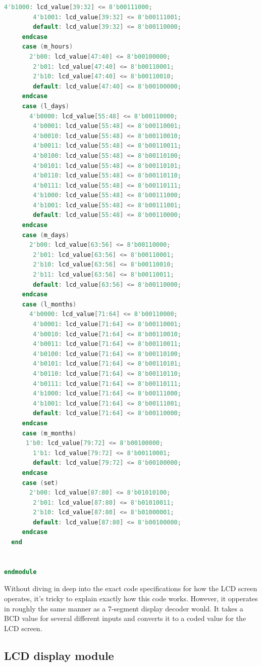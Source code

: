 \documentclass[12pt,a4paper,hidelinks]{article}            %
\begin{document}
\begin{lstlisting}[language=Verilog]
		4'b1000: lcd_value[39:32] <= 8'b00111000;
		4'b1001: lcd_value[39:32] <= 8'b00111001;
		default: lcd_value[39:32] <= 8'b00110000;
	 endcase
	 case (m_hours)
	   2'b00: lcd_value[47:40] <= 8'b00100000;
		2'b01: lcd_value[47:40] <= 8'b00110001;
		2'b10: lcd_value[47:40] <= 8'b00110010;
		default: lcd_value[47:40] <= 8'b00100000;
	 endcase
	 case (l_days)
	   4'b0000: lcd_value[55:48] <= 8'b00110000;
		4'b0001: lcd_value[55:48] <= 8'b00110001;
		4'b0010: lcd_value[55:48] <= 8'b00110010;
		4'b0011: lcd_value[55:48] <= 8'b00110011;
		4'b0100: lcd_value[55:48] <= 8'b00110100;
		4'b0101: lcd_value[55:48] <= 8'b00110101;
		4'b0110: lcd_value[55:48] <= 8'b00110110;
		4'b0111: lcd_value[55:48] <= 8'b00110111;
		4'b1000: lcd_value[55:48] <= 8'b00111000;
		4'b1001: lcd_value[55:48] <= 8'b00111001;
		default: lcd_value[55:48] <= 8'b00110000;
	 endcase
	 case (m_days)
	   2'b00: lcd_value[63:56] <= 8'b00110000;
		2'b01: lcd_value[63:56] <= 8'b00110001;
		2'b10: lcd_value[63:56] <= 8'b00110010;
		2'b11: lcd_value[63:56] <= 8'b00110011;
		default: lcd_value[63:56] <= 8'b00110000;
	 endcase
	 case (l_months)
	   4'b0000: lcd_value[71:64] <= 8'b00110000;
		4'b0001: lcd_value[71:64] <= 8'b00110001;
		4'b0010: lcd_value[71:64] <= 8'b00110010;
		4'b0011: lcd_value[71:64] <= 8'b00110011;
		4'b0100: lcd_value[71:64] <= 8'b00110100;
		4'b0101: lcd_value[71:64] <= 8'b00110101;
		4'b0110: lcd_value[71:64] <= 8'b00110110;
		4'b0111: lcd_value[71:64] <= 8'b00110111;
		4'b1000: lcd_value[71:64] <= 8'b00111000;
		4'b1001: lcd_value[71:64] <= 8'b00111001;
		default: lcd_value[71:64] <= 8'b00110000;
	 endcase
	 case (m_months)
      1'b0: lcd_value[79:72] <= 8'b00100000;
		1'b1: lcd_value[79:72] <= 8'b00110001;
		default: lcd_value[79:72] <= 8'b00100000;
	 endcase
	 case (set)
	   2'b00: lcd_value[87:80] <= 8'b01010100;
		2'b01: lcd_value[87:80] <= 8'b01010011;
		2'b10: lcd_value[87:80] <= 8'b01000001;
		default: lcd_value[87:80] <= 8'b00100000;
	 endcase
  end


endmodule
\end{lstlisting}

Without diving in deep into the exact code specifications for how the LCD screen operates, it's tricky to explain exactly how this code works. However, it opperates in roughly the same manner as a 7-segment display decoder would. It takes a BCD value for several different inputs and converts it to a coded value for the LCD screen.

\subsection{LCD display module}
\end{document}
